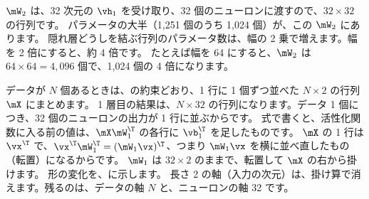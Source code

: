 $\mW_2$ は、32 次元の $\vh_1$ を受け取り、32 個のニューロンに渡すので、$32\times 32$ の行列です。
パラメータの大半（1,251 個のうち 1,024 個）が、この $\mW_2$ にあります。
隠れ層どうしを結ぶ行列のパラメータ数は、幅の 2 乗で増えます。幅を 2 倍にすると、約 4 倍です。
たとえば幅を 64 にすると、$\mW_2$ は $64\times 64=4{,}096$ 個で、1,024 個の 4 倍になります。

データが $N$ 個あるときは、の約束どおり、1 行に 1 個ずつ並べた $N\times 2$ の行列 $\mX$ にまとめます。
1 層目の結果は、$N\times 32$ の行列になります。データ 1 個につき、32 個のニューロンの出力が 1 行に並ぶからです。
式で書くと、活性化関数に入る前の値は、$\mX\mW_1^\T$ の各行に $\vb_1^\T$ を足したものです。
$\mX$ の 1 行は $\vx^\T$ で、$\vx^\T\mW_1^\T=(\mW_1\vx)^\T$、つまり $\mW_1\vx$ を横に並べ直したもの（転置）になるからです。
$\mW_1$ は $32\times 2$ のままで、転置して $\mX$ の右から掛けます。
形の変化を、に示します。
長さ 2 の軸（入力の次元）は、掛け算で消えます。残るのは、データの軸 $N$ と、ニューロンの軸 32 です。

